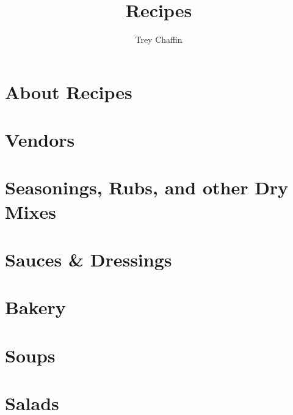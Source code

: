 \documentclass{article}
\title{Recipes}
\author{Trey Chaffin}
\begin{document}
\thispagestyle{empty}

\newpage{}

\tableofcontents
{}
\clearpage
{}

\section{About Recipes}


\section{Vendors}
\newpage{}

\section{Seasonings, Rubs, and other Dry Mixes}

\newpage{}

\section{Sauces \& Dressings}


\newpage{}

\newpage{}

\newpage{}
\newpage{}

\section{Bakery}

\newpage{}

\section{Soups}
\newpage{}
 \newpage{}
 \newpage{}

\section{Salads}

\newpage{}

\newpage{}
\newpage{}
\end{document}
